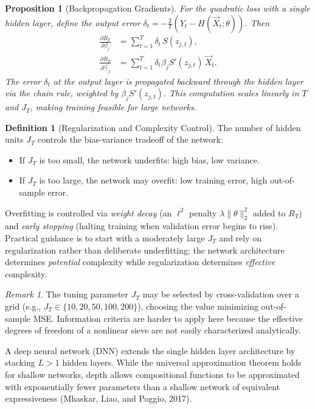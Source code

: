 \documentclass[11pt]{article}
\theoremstyle{definition}
\newtheorem{definition}{Definition}[section]
\theoremstyle{plain}
\newtheorem{proposition}{Proposition}[section]
\theoremstyle{remark}
\newtheorem{remark}{Remark}[section]
\begin{document}
\begin{proposition}[Backpropagation Gradients]
    For the quadratic loss with a single hidden layer, define the output error $\delta_t = -\frac{2}{T}(Y_t - H(\vec{X}_t;\theta))$. Then
    \begin{align}
        \frac{\partial R_T}{\partial \beta_j} &= \sum_{t=1}^T \delta_t \, S(z_{j,t}), \\
        \frac{\partial R_T}{\partial \vec{\gamma}_j} &= \sum_{t=1}^T \delta_t \beta_j S'(z_{j,t})\,\vec{X}_t.
    \end{align}
    The error $\delta_t$ at the output layer is propagated backward through the hidden layer via the chain rule, weighted by $\beta_j S'(z_{j,t})$. This computation scales linearly in $T$ and $J_T$, making training feasible for large networks.
\end{proposition}


\begin{definition}[Regularization and Complexity Control]
    The number of hidden units $J_T$ controls the bias-variance tradeoff of the network:
    \begin{itemize}[noitemsep]
        \item If $J_T$ is too small, the network underfits: high bias, low variance.
        \item If $J_T$ is too large, the network may overfit: low training error, high out-of-sample error.
    \end{itemize}
    Overfitting is controlled via \emph{weight decay} (an $\ell^2$ penalty $\lambda\|\theta\|_2^2$ added to $R_T$) and \emph{early stopping} (halting training when validation error begins to rise). Practical guidance is to start with a moderately large $J_T$ and rely on regularization rather than deliberate underfitting; the network architecture determines \emph{potential} complexity while regularization determines \emph{effective} complexity.
\end{definition}

\begin{remark}
    The tuning parameter $J_T$ may be selected by cross-validation over a grid (e.g., $J_T \in \{10, 20, 50, 100, 200\}$), choosing the value minimizing out-of-sample MSE. Information criteria are harder to apply here because the effective degrees of freedom of a nonlinear sieve are not easily characterized analytically.
\end{remark}


A deep neural network (DNN) extends the single hidden layer architecture by stacking $L > 1$ hidden layers. While the universal approximation theorem holds for shallow networks, depth allows compositional functions to be approximated with exponentially fewer parameters than a shallow network of equivalent expressiveness (Mhaskar, Liao, and Poggio, 2017).
\end{document}
